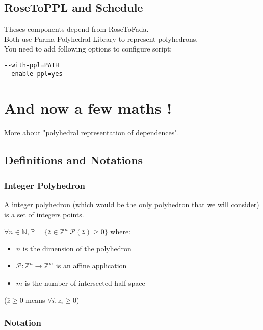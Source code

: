 		\subsection{RoseToPPL and Schedule}

	Theses components depend from RoseToFada.\\
	Both use Parma Polyhedral Library \cite{PPL} to represent polyhedrons.\\
	You need to add following options to configure script:
\begin{verbatim}
--with-ppl=PATH
--enable-ppl=yes
\end{verbatim}
		

	\section{And now a few maths !}
	\label{polyhedric:maths}

More about "polyhedral representation of dependences".

		\subsection{Definitions and Notations}
		\label{polyhedric:maths:defs}

			\subsubsection{Integer Polyhedron}
			\label{polyhedric:maths:defs:polyhedron}

A integer polyhedron (which would be the only polyhedron that we will consider) is a set of integers points.

$\forall n \in \mathbb{N}, \mathbb{P} = \{\bar{z} \in \mathbb{Z}^{n} | \mathcal{P}(\bar{z}) \geq 0 \}$ where:
\begin{itemize}
	\item $n$ is the dimension of the polyhedron
	\item $\mathcal{P}: \mathbb{Z}^{n} \rightarrow \mathbb{Z}^{m}$ is an affine application
	\item $m$ is the number of intersected half-space
\end{itemize}
($\bar{z} \geq 0$ means $\forall i, z_{i} \geq 0$)

			\subsubsection{Notation}
			\label{polyhedric:maths:defs:notation}

